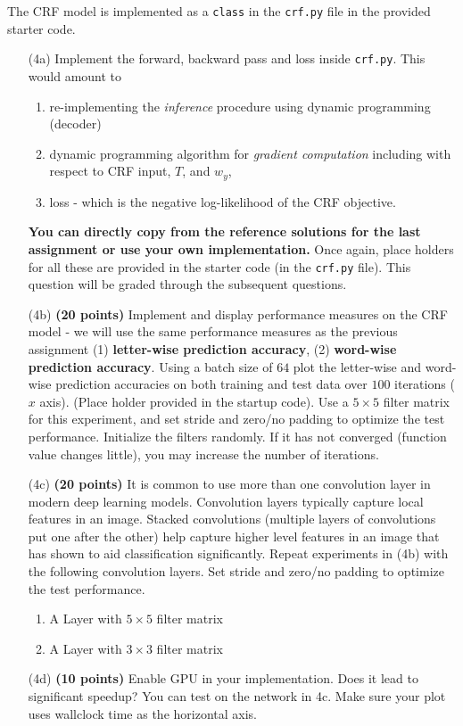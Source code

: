 \documentclass[11pt]{report}
\begin{document}
The CRF model is implemented as a \texttt{class} in the \texttt{crf.py} file in
the provided starter code.
%
\begin{itemize}
\item[(4a)] Implement the forward, backward pass and loss inside
  \texttt{crf.py}. This would amount to 
  \begin{enumerate}
  	\item re-implementing the \emph{inference} procedure using dynamic programming (decoder) 
  	\item dynamic programming algorithm for \emph{gradient computation} including with respect to CRF input, $T$, and $w_y$,
  	\item loss - which is the negative log-likelihood of the CRF objective. 
  \end{enumerate} 
	\textbf{You can directly copy from the reference solutions for the last assignment or use your own implementation.}
  Once again, place holders for
  all these are provided in the starter code (in the \texttt{crf.py} file). This
  question will be graded through the subsequent questions.

\item[(4b)] \textbf{(20 points)} Implement and display performance measures on
  the CRF model - we will use the same performance measures as the previous
  assignment (1) \textbf{letter-wise prediction accuracy}, (2) \textbf{word-wise
    prediction accuracy}. Using a batch size of \(64\) plot the letter-wise and
  word-wise prediction accuracies on both training and test data over \(100\)
  iterations (\(x\) axis). (Place holder provided in the startup code). Use a
  \(5 \times 5\) filter matrix for this experiment, and set stride and zero/no
  padding to optimize the test performance.
  Initialize the filters randomly.
  If it has not converged (function value changes little), you may increase the number of iterations.
  
  
  

\item [(4c)] {\bf (20 points)} It is common to use more than one convolution
  layer in modern deep learning models. Convolution layers typically capture
  local features in an image. Stacked convolutions (multiple layers of
  convolutions put one after the other) help capture higher level features in an
  image that has shown to aid classification significantly. Repeat experiments
  in (4b) with the following convolution layers. Set stride and zero/no padding
  to optimize the test performance.


\begin{enumerate}
	\item A Layer with \(5 \times 5\) filter matrix
	\item A Layer with \(3 \times 3\) filter matrix
\end{enumerate}


\item [(4d)] {\bf (10 points)} Enable GPU in your implementation. Does it lead
  to significant speedup? You can test on the network in 4c. Make sure your plot
  uses wallclock time as the horizontal axis.
\end{itemize}
\end{document}
